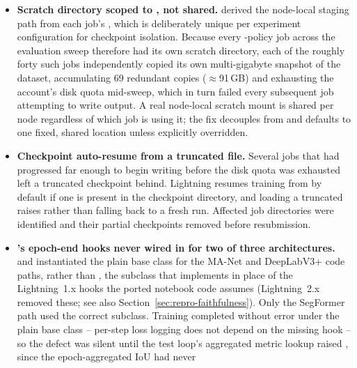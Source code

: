 \begin{itemize}
  \item \textbf{Scratch directory scoped to , not shared.}
     derived the node-local staging path from each
    job's , which is deliberately unique per experiment
    configuration for checkpoint isolation. Because every -policy
    job across the evaluation sweep therefore had its own scratch directory, each
    of the roughly forty such jobs independently copied its own multi-gigabyte
    snapshot of the dataset, accumulating 69 redundant copies ($\approx$91\,GB)
    and exhausting the account's disk quota mid-sweep, which in turn failed every
    subsequent job attempting to write output. A real node-local scratch mount is
    shared per node regardless of which job is using it; the fix decouples
     from  and defaults to one fixed,
    shared location unless explicitly overridden.
  \item \textbf{Checkpoint auto-resume from a truncated file.} Several jobs that
    had progressed far enough to begin writing  before the disk
    quota was exhausted left a truncated checkpoint behind. Lightning resumes
    training from  by default if one is present in the
    checkpoint directory, and loading a truncated  raises
     rather
    than falling back to a fresh run. Affected job directories were identified
    and their partial checkpoints removed before resubmission.
  \item \textbf{'s epoch-end hooks never wired in for
    two of three architectures.}  and
     instantiated the plain
     base class for the MA-Net and DeepLabV3+ code paths,
    rather than , the subclass that implements
     in place of the
    Lightning~1.x  hooks the ported notebook
    code assumes (Lightning~2.x removed these; see also
    Section~\ref{sec:repro-faithfulness}). Only the SegFormer path used the
    correct subclass. Training completed without error under the plain base
    class -- per-step loss logging does not depend on the missing hook -- so the
    defect was silent until the test loop's aggregated metric lookup raised
    , since the epoch-aggregated IoU had never

\end{itemize}
